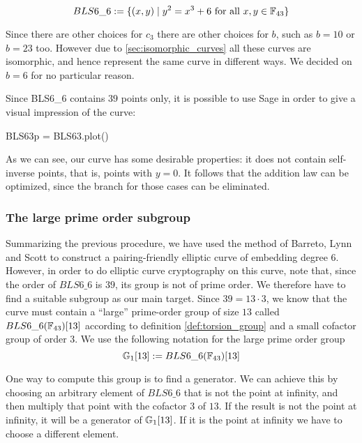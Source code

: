 \begin{equation}
BLS6\_6 := \{(x,y)\;|\; y^2 = x^3 + 6 \text{ for all } x,y \in \mathbb{F}_{43}\}
\end{equation}

Since there are other choices for $c_3$ there are other choices for $b$, such as $b=10$ or $b=23$ too. However due to \ref{sec:isomorphic_curves} all these curves are isomorphic, and hence represent the same curve in different ways. We decided on $b=6$ for no particular reason.

Since BLS6\_6 contains $39$ points only, it is possible to use Sage in order to give a visual impression of the curve:

\begin{sagesilent}
BLS63p = BLS63.plot()
\end{sagesilent}
\begin{center} 
\end{center}

As we can see, our curve has some desirable properties: it does not contain self-inverse points, that is, points with $y=0$. It follows that the addition law can be optimized, since the branch for those cases can be eliminated. 

\subsubsection{The large prime order subgroup}
Summarizing the previous procedure, we have used the method of Barreto, Lynn and Scott to construct a pairing-friendly elliptic curve of embedding degree $6$. However, in order to do elliptic curve cryptography on this curve, note that, since the order of $BLS6\_6$ is $39$, its group is not of prime order. We therefore have to find a suitable subgroup as our main target. Since $39=13\cdot 3$, we know that the curve must contain a ``large'' prime-order group of size $13$ called $BLS6\_6(\mathbb{F}_{43})[13]$ according to definition \ref{def:torsion_group} and a small cofactor group of order $3$. We use the following notation for the large prime order group
\begin{equation}
\label{def:BLS6613}
\mathbb{G}_1[13]:= BLS6\_6(\mathbb{F}_{43})[13]
\end{equation}

One way to compute this group is to find a generator. We can achieve this by choosing an arbitrary element of $BLS6\_6$ that is not the point at infinity, and then multiply that point with the cofactor $3$ of $13$. If the result is not the point at infinity, it will be a generator of $\mathbb{G}_1[13]$. If it is the point at infinity we have to choose a different element. 

